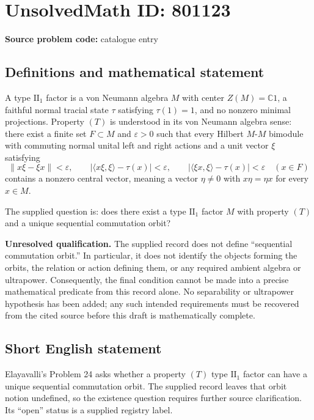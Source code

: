 \documentclass[11pt]{article}
\newcommand{\C}{\mathbb{C}}
\begin{document}
\section*{UnsolvedMath ID: 801123}
\textbf{Source problem code:} catalogue entry
\subsection{Definitions and mathematical statement}
A type \(\mathrm{II}_1\) factor is a von Neumann algebra \(M\) with center \(Z(M)=\C 1\), a faithful normal tracial state \(\tau\) satisfying \(\tau(1)=1\), and no nonzero minimal projections. Property \((T)\) is understood in its von Neumann algebra sense: there exist a finite set \(F\subset M\) and \(\varepsilon>0\) such that every Hilbert \(M\)-\(M\) bimodule with commuting normal unital left and right actions and a unit vector \(\xi\) satisfying
\[
\|x\xi-\xi x\|<\varepsilon,\qquad
\bigl|\langle x\xi,\xi\rangle-\tau(x)\bigr|<\varepsilon,\qquad
\bigl|\langle \xi x,\xi\rangle-\tau(x)\bigr|<\varepsilon
\quad(x\in F)
\]
contains a nonzero central vector, meaning a vector \(\eta\ne0\) with \(x\eta=\eta x\) for every \(x\in M\).

The supplied question is: does there exist a type \(\mathrm{II}_1\) factor \(M\) with property \((T)\) and a unique sequential commutation orbit?

\textbf{Unresolved qualification.} The supplied record does not define ``sequential commutation orbit.'' In particular, it does not identify the objects forming the orbits, the relation or action defining them, or any required ambient algebra or ultrapower. Consequently, the final condition cannot be made into a precise mathematical predicate from this record alone. No separability or ultrapower hypothesis has been added; any such intended requirements must be recovered from the cited source before this draft is mathematically complete.
\subsection{Short English statement}
Elayavalli's Problem 24 asks whether a property \((T)\) type \(\mathrm{II}_1\) factor can have a unique sequential commutation orbit. The supplied record leaves that orbit notion undefined, so the existence question requires further source clarification. Its ``open'' status is a supplied registry label.
\end{document}
